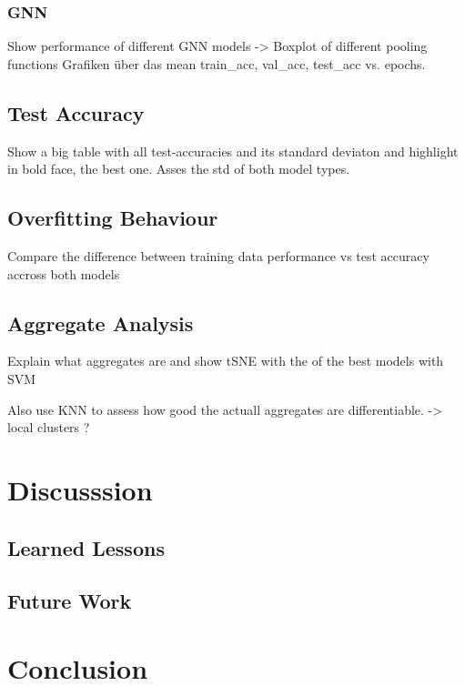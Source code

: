 \subsubsection{GNN}
Show performance of different GNN models -> Boxplot of different pooling functions
Grafiken über das mean train\_acc, val\_acc, test\_acc vs. epochs.

\subsection{Test Accuracy}
Show a big table with all test-accuracies and its standard deviaton and highlight in bold face, the best one.
Asses the std of both model types.

\subsection{Overfitting Behaviour}
Compare the difference between training data performance vs test accuracy accross both models

\subsection{Aggregate Analysis}
Explain what aggregates are and show tSNE with the of the best models with SVM

Also use KNN to assess how good the actuall aggregates are differentiable. -> local clusters ?

\section{Discusssion}
\subsection{Learned Lessons}
\subsection{Future Work}

\section{Conclusion}